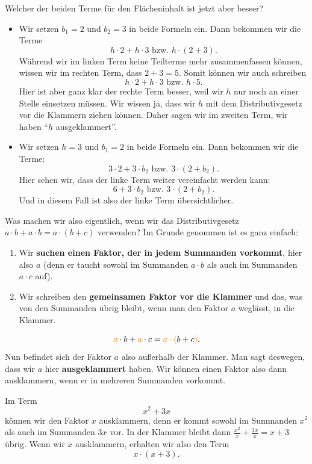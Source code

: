 \documentclass[../../main.tex]{subfiles}
\begin{document}
\begin{example}{}
		Welcher der beiden Terme für den Flächeninhalt ist jetzt aber besser?
		\begin{itemize}
			\item Wir setzen $b_1=2$ und $b_2=3$ in beide Formeln ein. Dann bekommen wir die Terme
				\[h\cdot 2 + h\cdot 3 \text{ bzw. } h\cdot(2+3).\]
				Während wir im linken Term keine Teilterme mehr zusammenfassen können, wissen wir im rechten Term, dass $2+3=5$.
				Somit können wir auch schreiben
				\[h\cdot 2 + h\cdot 3 \text{ bzw. } h\cdot 5.\]
				Hier ist aber ganz klar der rechte Term besser, weil wir $h$ nur noch an einer Stelle einsetzen müssen.
				Wir wissen ja, dass wir $h$ mit dem Distributivgesetz vor die Klammern ziehen können. Daher sagen wir
				im zweiten Term, wir haben \enquote{$h$ ausgeklammert}.
			\item Wir setzen $h=3$ und $b_1=2$ in beide Formeln ein. Dann bekommen wir die Terme:
				\[3\cdot2+3\cdot b_2 \text{ bzw. } 3\cdot(2+b_2).\]
				Hier sehen wir, dass der linke Term weiter vereinfacht werden kann:
				\[6+3\cdot b_2 \text{ bzw. } 3\cdot(2+b_2).\]
				Und in diesem Fall ist also der linke Term übersichtlicher.
		\end{itemize}
		\fi
	\end{example}

	Was machen wir also eigentlich, wenn wir das Distributivgesetz $a\cdot b+a\cdot b=a\cdot (b+c)$ verwenden? Im Grunde genommen ist es ganz einfach: 
	\begin{enumerate}
		\item Wir \textbf{suchen einen Faktor, der in jedem Summanden vorkommt}, hier also $a$ (denn er taucht sowohl im Summanden $a\cdot b$ als auch im Summanden $a\cdot c$ auf). 
		\item Wir schreiben den \textbf{gemeinsamen Faktor vor die Klammer} und das, was von den Summanden übrig bleibt, wenn man den Faktor $a$ weglässt, in die Klammer.
	\end{enumerate}
	\[{\color{orange}a}\cdot b + {\color{orange}a}\cdot c = {\color{orange}a\cdot (}b+c{\color{orange})}.\]
	Nun befindet sich der Faktor $a$ also außerhalb der Klammer. Man sagt deswegen, dass wir $a$ hier \textbf{ausgeklammert} haben. Wir können einen Faktor also dann ausklammern, wenn er in mehreren Summanden vorkommt.

	\begin{example}{}
		Im Term \[x^2+3x\] können wir den Faktor $x$ ausklammern, denn er kommt sowohl im Summanden $x^2$ als auch im Summanden $3x$ vor. In der Klammer bleibt dann $\frac{x^2}{x}+\frac{3x}{x}=x+3$ übrig. Wenn wir $x$ ausklammern, erhalten wir also den Term \[x\cdot (x+3).\]
	\end{example}
	
\end{document}

